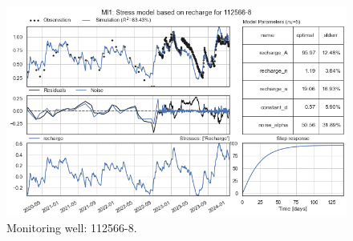 \begin{figure}[htbp]
\begin{minipage}{0.32\textwidth}
        \centering
        \includegraphics[width=\linewidth]{frontmatter/Rozenburg-fig/27.png}
        \caption{Monitoring well: 112566-8.}
        \label{fig:112565-3}
    \end{minipage}
\end{figure}


